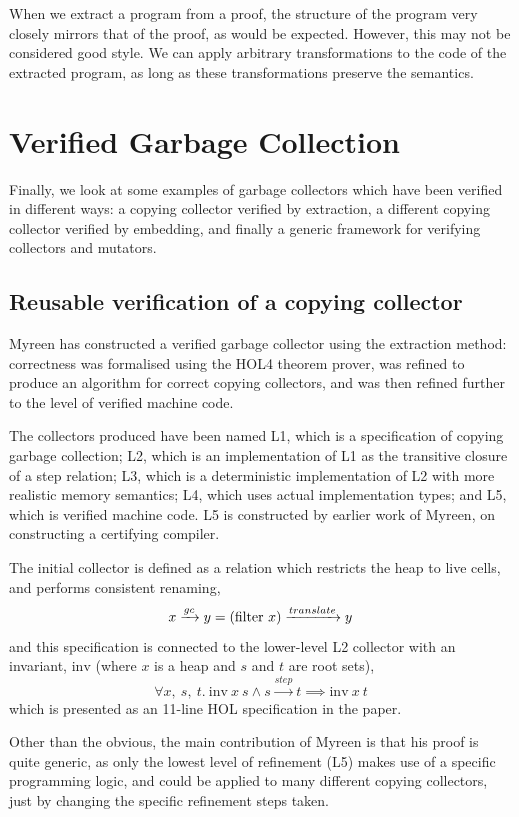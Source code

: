 When we extract a program from a proof, the structure of the program
very closely mirrors that of the proof, as would be expected. However,
this may not be considered good style. We can apply arbitrary
transformations to the code of the extracted program, as long as these
transformations preserve the semantics.

\section{Verified Garbage Collection}
\label{sec:lit-verifiedgc}

Finally, we look at some examples of garbage collectors which have
been verified in different ways: a copying collector verified by
extraction, a different copying collector verified by embedding, and
finally a generic framework for verifying collectors and mutators.

\subsection{Reusable verification of a copying collector}
\label{sec:lit-verifiedgc-myreen}

Myreen\cite{Myreen10} has constructed a verified garbage collector
using the extraction method: correctness was formalised using the HOL4
theorem prover, was refined to produce an algorithm for correct
copying collectors, and was then refined further to the level of
verified machine code.

The collectors produced have been named L1, which is a specification
of copying garbage collection; L2, which is an implementation of L1 as
the transitive closure of a step relation; L3, which is a
deterministic implementation of L2 with more realistic memory
semantics; L4, which uses actual implementation types; and L5, which
is verified machine code. L5 is constructed by earlier work of Myreen,
on constructing a certifying compiler.

The initial collector is defined as a relation which restricts the
heap to live cells, and performs consistent renaming, \[x \xrightarrow{gc} y =
(\mathrm{filter}~x) \xrightarrow{translate} y\] and this specification is connected
to the lower-level L2 collector with an invariant, $\mathrm{inv}$
(where $x$ is a heap and $s$ and $t$ are root sets), \[\forall
x,~s,~t.\ \mathrm{inv}~x~s \land s \xrightarrow{step} t \implies
\mathrm{inv}~x~t\] which is presented as an 11-line HOL specification
in the paper.

Other than the obvious, the main contribution of Myreen is that his
proof is quite generic, as only the lowest level of refinement (L5)
makes use of a specific programming logic, and could be applied to many
different copying collectors, just by changing the specific refinement
steps taken.

